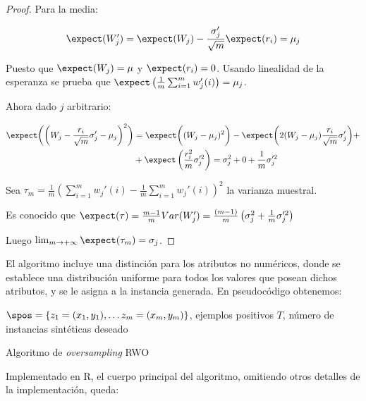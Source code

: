 \begin{proof}
Para la media:
 
 \[\expect(W_j') = \expect(W_j) - \frac{\sigma_j'}{\sqrt{m}} \expect(r_i) = \mu_j\]
 
 Puesto que $\expect(W_j) = \mu$ y $\expect(r_i) = 0$. Usando linealidad de la esperanza se prueba que
 $\expect\left(\frac{1}{m} \sum_{i=1}^m w_j'(i)\right) = \mu_j$.
 
 Ahora dado $j$ arbitrario:
 
 \begin{align*}
   \expect \bigg(\bigg(W_j - \frac{r_i}{\sqrt{m}} \sigma_j' - \mu_j\bigg)^2\bigg) &= 
   \expect \bigg((W_j - \mu_j)^2 \bigg) - \expect\bigg( 2 (W_j-\mu_j) \frac{r_i}{\sqrt{m}} \sigma_j' \bigg) + \\
   &+ \expect\left(\frac{r_i^2}{m} \sigma_j'^2 \right) = \sigma_j^2 + 0 + \frac{1}{m}\sigma_j'^2
 \end{align*}
 
 Sea $\tau_m = \frac{1}{m} \left(\sum_{i=1}^m w_j'(i) - \frac{1}{m} \sum_{i=1}^m w_j'(i)\right)^2$ la varianza muestral.
 
 Es conocido que $\expect(\tau) = \frac{m-1}{m} Var(W_j') = 
 \frac{(m-1)}{m} \left(\sigma_j^2 + \frac{1}{m} \sigma_j'^2\right)$

 Luego $\lim_{m\rightarrow + \infty} \expect(\tau_m) = \sigma_j$.
\end{proof}

El algoritmo incluye una distinción para los atributos no numéricos, donde se establece una distribución uniforme
para todos los valores que posean dichos atributos, y se le asigna a la instancia generada. En pseudocódigo
obtenemos:

\begin{algorithm}[H]
\begin{algorithmic}[1]
  \REQUIRE $\spos = \{z_1=(x_1, y_1), \ldots z_m=(x_m, y_m)\}$, ejemplos positivos
  \REQUIRE $T$, número de instancias sintéticas deseado
  \NEWLINE
    \ENDIF
  \ENDFOR
  \NEWLINE
	 \ELSE
	 \ENDIF
      \ENDFOR
    \ENDFOR
  \ENDFOR
  \NEWLINE
\end{algorithmic}
\caption{Algoritmo de \textit{oversampling} RWO}
\label{alg:rwo}
\end{algorithm}

Implementado en R, el cuerpo principal del algoritmo, omitiendo otros detalles de la implementación, queda:

